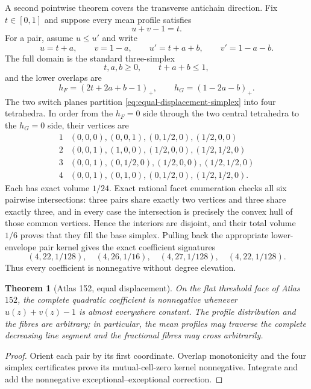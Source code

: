 \documentclass[11pt]{article}
\newtheorem{theorem}{Theorem}[section]
\begin{document}
A second pointwise theorem covers the transverse antichain direction.  Fix
$t\in[0,1]$ and suppose every mean profile satisfies
\[
 u+v-1=t.
\]
For a pair, assume $u\leq u'$ and write
\[
 u=t+a,\qquad v=1-a,\qquad
 u'=t+a+b,\qquad v'=1-a-b.
\]
The full domain is the standard three-simplex
\begin{equation}
 t,a,b\geq0,\qquad t+a+b\leq1,
 \label{eq:equal-displacement-simplex}
\end{equation}
and the lower overlaps are
\[
 h_F=(2t+2a+b-1)_+,\qquad
 h_G=(1-2a-b)_+.
\]
The two switch planes partition \eqref{eq:equal-displacement-simplex} into
four tetrahedra.  In order from the $h_F=0$ side through the two central
tetrahedra to the $h_G=0$ side, their vertices are
\[
\begin{array}{c|l}
1&(0,0,0),(0,0,1),(0,1/2,0),(1/2,0,0)\\
2&(0,0,1),(1,0,0),(1/2,0,0),(1/2,1/2,0)\\
3&(0,0,1),(0,1/2,0),(1/2,0,0),(1/2,1/2,0)\\
4&(0,0,1),(0,1,0),(0,1/2,0),(1/2,1/2,0).
\end{array}
\]
Each has exact volume $1/24$.  Exact rational facet enumeration checks all
six pairwise intersections: three pairs share exactly two vertices and
three share exactly three, and in every case the intersection is precisely
the convex hull of those common vertices.  Hence the interiors are disjoint,
and their total volume $1/6$ proves that they fill the base simplex.
Pulling back the appropriate lower-envelope pair kernel gives the exact
coefficient signatures
\[
 (4,22,1/128),\quad(4,26,1/16),\quad
 (4,27,1/128),\quad(4,22,1/128).
\]
Thus every coefficient is nonnegative without degree elevation.

\begin{theorem}[Atlas 152, equal displacement]
\label{thm:atlas152-equal-displacement}
On the flat threshold face of Atlas $152$, the complete quadratic
coefficient is nonnegative whenever $u(z)+v(z)-1$ is almost everywhere
constant.  The profile distribution and the fibres are arbitrary; in
particular, the mean profiles may traverse the complete decreasing line
segment and the fractional fibres may cross arbitrarily.
\end{theorem}

\begin{proof}
Orient each pair by its first coordinate.  Overlap monotonicity and the four
simplex certificates prove its mutual-cell-zero kernel nonnegative.  Integrate
and add the nonnegative exceptional--exceptional correction.
\end{proof}
\end{document}
